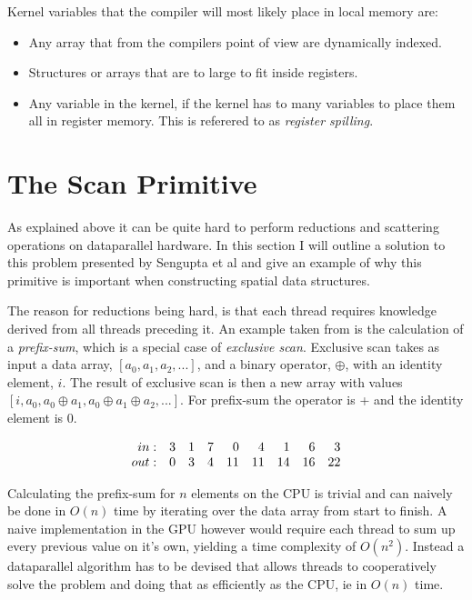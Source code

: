 Kernel variables that the compiler will most likely place in local
memory are:

\begin{itemize}
  \item Any array that from the compilers point of view are
    dynamically indexed.
  \item Structures or arrays that are to large to fit inside registers.
  \item Any variable in the kernel, if the kernel has to many
    variables to place them all in register memory. This is referered
    to as \textit{register spilling}.
\end{itemize}



\section{The Scan Primitive}\label{sec:GPUprims}


As explained above it can be quite hard to perform reductions and
scattering operations on dataparallel hardware. In this section I will
outline a solution to this problem presented by Sengupta et
al and give an example of why this primitive
is important when constructing spatial data structures.


The reason for reductions being hard, is that each thread requires
knowledge derived from all threads preceding it. An example taken from
 is the calculation of a \textit{prefix-sum},
which is a special case of \textit{exclusive scan}. Exclusive scan
takes as input a data array, $[a_0, a_1, a_2, ...]$, and a binary
operator, $\oplus$, with an identity element, $i$. The result of
exclusive scan is then a new array with values $[i, a_0, a_0 \oplus
  a_1, a_0 \oplus a_1 \oplus a_2, ...]$. For prefix-sum the operator
is + and the identity element is 0.

\begin{displaymath}
  \begin{array}{r r r r r r r r r}
    in: & 3 & 1 & 7 & 0 & 4 & 1 & 6 & 3 \\
    out: & 0 & 3 & 4 & 11 & 11 & 14 & 16 & 22 \\
  \end{array}
\end{displaymath}

Calculating the prefix-sum for $n$ elements on the CPU is trivial and
can naively be done in $O(n)$ time by iterating over the data array
from start to finish. A naive implementation in the GPU however would
require each thread to sum up every previous value on it's own,
yielding a time complexity of $O(n^2)$. Instead a dataparallel
algorithm has to be devised that allows threads to cooperatively solve
the problem and doing that as efficiently as the CPU, ie in $O(n)$
time.


